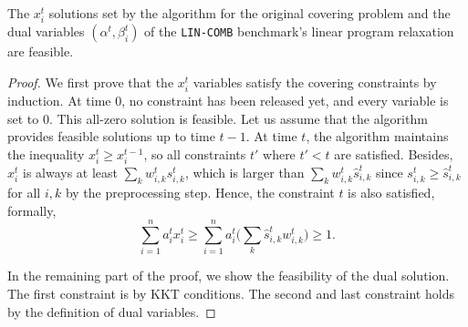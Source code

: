 \begin{lemma} \label{lem:covering-feasibility}
The $x_{i}^{t}$ solutions set by the algorithm for the original covering problem and the dual variables $(\alpha^{t}, \beta_{i}^{t})$ of the \texttt{LIN-COMB} benchmark's linear program relaxation are feasible.
\end{lemma}
%
\begin{proof}
We first prove that the $x_{i}^{t}$ variables satisfy the covering constraints by induction. At time 0, no constraint has been released yet, and every variable is set to 0. This all-zero solution is feasible. Let us assume that the algorithm provides feasible solutions up to time $t-1$. At time $t$, the algorithm maintains the inequality $x_{i}^{t} \geq x_{i}^{t-1}$, so all constraints $t'$ where $t' < t$ are satisfied. Besides, $x_{i}^{t}$ is always at least
$\sum_{k} w_{i,k}^{t} s_{i,k}^{t}$, which is larger than $\sum_{k} w_{i,k}^{t} \hat{s}_{i,k}^{t}$ since $s_{i,k}^{t} \geq \hat{s}_{i,k}^{t}$
for all $i,k$ by the preprocessing step. Hence, the constraint $t$ is also satisfied, formally,
$$
\sum_{i=1}^{n} a_{i}^{t} x_{i}^{t}  \geq \sum_{i=1}^{n} a_{i}^{t} \biggl( \sum_{k} \hat{s}_{i,k}^{t} w_{i,k}^{t} \biggr) \geq 1.
$$

In the remaining part of the proof, we show the feasibility of the dual solution.
The first constraint is by KKT conditions.
The second and last constraint holds by the definition of dual variables.

\end{proof}


